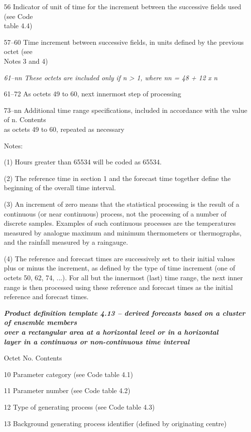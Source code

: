 56 Indicator of unit of time for the increment between the successive fields used (see Code\\
table 4.4)

57--60 Time increment between successive fields, in units defined by the previous octet (see\\
Notes 3 and 4)

\emph{61--nn These octets are included only if n \textgreater{} 1, where nn = 48 + 12 x n}

61--72 As octets 49 to 60, next innermost step of processing

73--nn Additional time range specifications, included in accordance with the value of n. Contents\\
as octets 49 to 60, repeated as necessary

Notes:

(1) Hours greater than 65534 will be coded as 65534.

(2) The reference time in section 1 and the forecast time together define the beginning of the overall time interval.

(3) An increment of zero means that the statistical processing is the result of a continuous (or near continuous) process, not the processing of a number of discrete samples. Examples of such continuous processes are the temperatures measured by analogue maximum and minimum thermometers or thermographs, and the rainfall measured by a raingauge.

(4) The reference and forecast times are successively set to their initial values plus or minus the increment, as defined by the type of time increment (one of octets 50, 62, 74, ...). For all but the innermost (last) time range, the next inner range is then processed using these reference and forecast times as the initial reference and forecast times.

\emph{\textbf{Product definition template 4.13 -- derived forecasts based on a cluster of ensemble members\\
over a rectangular area at a horizontal level or in a horizontal\\
layer in a continuous or non-continuous time interval}}

Octet No. Contents

10 Parameter category (see Code table 4.1)

11 Parameter number (see Code table 4.2)

12 Type of generating process (see Code table 4.3)

13 Background generating process identifier (defined by originating centre)

